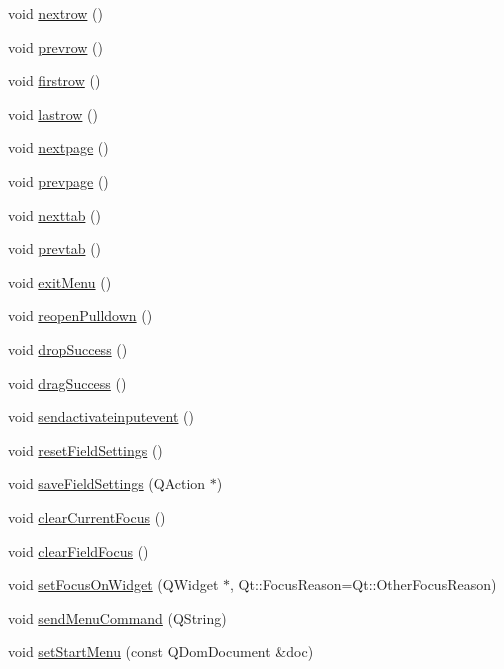 \begin{DoxyCompactItemize}
\item 
void \hyperlink{classFglForm_a0321ef0bb745923607aecc90ff23dc16}{nextrow} ()
\item 
void \hyperlink{classFglForm_a92a335499ab7c95fa5b106f7a9f21e33}{prevrow} ()
\item 
void \hyperlink{classFglForm_af18f12d697d5a9fa0041c597d692d8f1}{firstrow} ()
\item 
void \hyperlink{classFglForm_adbc1aae701b9f9be093df1b60072ed10}{lastrow} ()
\item 
void \hyperlink{classFglForm_aafc9f7cacb9852d58b809a840abc104e}{nextpage} ()
\item 
void \hyperlink{classFglForm_ac3cf8e2f5bfc433cb19497e6bad4db0d}{prevpage} ()
\item 
void \hyperlink{classFglForm_a3f1ae54d6ef1585a6f14cf394758c09b}{nexttab} ()
\item 
void \hyperlink{classFglForm_a9eefd50c2b2dbcd9303a20a02a2ad140}{prevtab} ()
\item 
void \hyperlink{classFglForm_ac9689ad22eff52db3ab60446b78274e3}{exitMenu} ()
\item 
void \hyperlink{classFglForm_a267469fbb08f5d257f162df03b88852a}{reopenPulldown} ()
\item 
void \hyperlink{classFglForm_a0ccb7e3f717496c6dceaf34b0a6d49df}{dropSuccess} ()
\item 
void \hyperlink{classFglForm_a2a05aab413be356d8591d9feaa3818ea}{dragSuccess} ()
\item 
void \hyperlink{classFglForm_a6c13e4f1841a38f5cbf615595f88f78f}{sendactivateinputevent} ()
\item 
void \hyperlink{classFglForm_a1d7dad289a4b04321a2c932adf12d19b}{resetFieldSettings} ()
\item 
void \hyperlink{classFglForm_a3d7ccbba13b950e970333db68755d022}{saveFieldSettings} (QAction $\ast$)
\item 
void \hyperlink{classFglForm_a4430f1038e2dcfd957c1d361d0c286d4}{clearCurrentFocus} ()
\item 
void \hyperlink{classFglForm_ae2815f84a3c114c000f97cc0cf431bb7}{clearFieldFocus} ()
\item 
void \hyperlink{classFglForm_abacf589f219bcfbcf54ca2a5fb9ba859}{setFocusOnWidget} (QWidget $\ast$, Qt::FocusReason=Qt::OtherFocusReason)
\item 
void \hyperlink{classFglForm_a5e7fe57471d1f3ad4d6dbf7ac1c8b843}{sendMenuCommand} (QString)
\item 
void \hyperlink{classFglForm_af3d272e5dc101746b728bdd457d42a6f}{setStartMenu} (const QDomDocument \&doc)

\end{DoxyCompactItemize}
